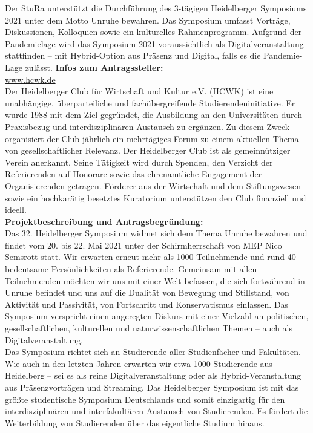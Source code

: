 {
    Der StuRa unterstützt die Durchführung des 3-tägigen Heidelberger Symposiums 2021 unter dem Motto Unruhe bewahren. Das Symposium umfasst Vorträge, Diskussionen, Kolloquien sowie ein kulturelles Rahmenprogramm. Aufgrund der Pandemielage wird das Symposium 2021 voraussichtlich als Digitalveranstaltung stattfinden – mit Hybrid-Option aus Präsenz und Digital, falls es die Pandemie-Lage zulässt.
}{
    \textbf{Infos zum Antragssteller:}\\
    \url{www.hcwk.de}\\
    Der Heidelberger Club für Wirtschaft und Kultur e.V. (HCWK) ist eine unabhängige, überparteiliche und fachübergreifende Studierendeninitiative. Er wurde 1988 mit dem Ziel gegründet, die Ausbildung an den Universitäten durch Praxisbezug und interdisziplinären Austausch zu ergänzen. Zu diesem Zweck organisiert der Club jährlich ein mehrtägiges Forum zu einem aktuellen Thema von gesellschaftlicher Relevanz. Der Heidelberger Club ist als gemeinnütziger Verein anerkannt. Seine Tätigkeit wird durch Spenden, den Verzicht der Referierenden auf Honorare sowie das ehrenamtliche Engagement der Organisierenden getragen. Förderer aus der Wirtschaft und dem Stiftungswesen sowie ein hochkarätig besetztes Kuratorium unterstützen den Club finanziell und ideell.\\[1em]
    \textbf{Projektbeschreibung und Antragsbegründung:}\\
    Das 32. Heidelberger Symposium widmet sich dem Thema Unruhe bewahren und findet vom 20. bis 22. Mai 2021 unter der Schirmherrschaft von MEP Nico Semsrott statt. Wir erwarten erneut mehr als 1000 Teilnehmende und rund 40 bedeutsame Persönlichkeiten als Referierende. Gemeinsam mit allen Teilnehmenden möchten wir uns mit einer Welt befassen, die sich fortwährend in Unruhe befindet und uns auf die Dualität von Bewegung und Stillstand, von Aktivität und Passivität, von Fortschritt und Konservatismus einlassen. Das Symposium verspricht einen angeregten Diskurs mit einer Vielzahl an politischen, gesellschaftlichen, kulturellen und naturwissenschaftlichen Themen – auch als Digitalveranstaltung.\\
    Das Symposium richtet sich an Studierende aller Studienfächer und Fakultäten. Wie auch in den letzten Jahren erwarten wir etwa 1000 Studierende aus Heidelberg – sei es als reine Digitalveranstaltung oder als Hybrid-Veranstaltung aus Präsenzvorträgen und Streaming. Das Heidelberger Symposium ist mit das größte studentische Symposium Deutschlands und somit einzigartig für den interdisziplinären und interfakultären Austausch von Studierenden. Es fördert die Weiterbildung von Studierenden über das eigentliche Studium hinaus.\\[1em]
}
